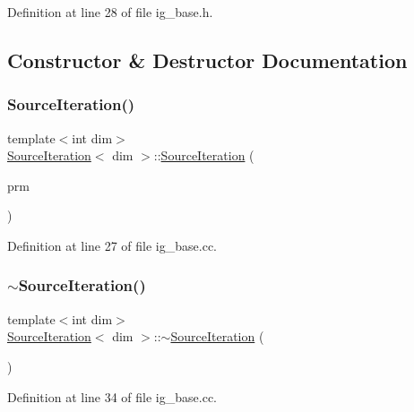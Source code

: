 Definition at line 28 of file ig\+\_\+base.\+h.



\subsection{Constructor \& Destructor Documentation}
\mbox{\label{class_source_iteration_a50f7b38da2b8550f069386606026dc19}} 
\subsubsection{\texorpdfstring{Source\+Iteration()}{SourceIteration()}}
{\footnotesize\ttfamily template$<$int dim$>$ \\
\hyperlink{class_source_iteration}{Source\+Iteration}$<$ dim $>$\+::\hyperlink{class_source_iteration}{Source\+Iteration} (\begin{DoxyParamCaption}\item[{const Parameter\+Handler \&}]{prm }\end{DoxyParamCaption})}



Definition at line 27 of file ig\+\_\+base.\+cc.

\mbox{\label{class_source_iteration_ae18057a8b8501d9e89b08ecfb33ef499}} 
\subsubsection{\texorpdfstring{$\sim$\+Source\+Iteration()}{~SourceIteration()}}
{\footnotesize\ttfamily template$<$int dim$>$ \\
\hyperlink{class_source_iteration}{Source\+Iteration}$<$ dim $>$\+::$\sim$\hyperlink{class_source_iteration}{Source\+Iteration} (\begin{DoxyParamCaption}{ }\end{DoxyParamCaption})}



Definition at line 34 of file ig\+\_\+base.\+cc.



